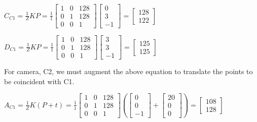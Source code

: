 \documentclass[12pt, letterpaper]{article}
\begin{document}
\vspace{0.4cm}
\indent $ C_{C1} = \frac{1}{Z}KP = \frac{1}{1}\begin{bmatrix}  1&0&128 \\ 0&1&128 \\ 0&0&1  \end{bmatrix} \begin{bmatrix} 0\\3\\-1 \end{bmatrix} = \begin{bmatrix} 128\\122 \end{bmatrix} $

\vspace{0.4cm}
\indent $ D_{C1} = \frac{1}{Z}KP = \frac{1}{1}\begin{bmatrix}  1&0&128 \\ 0&1&128 \\ 0&0&1  \end{bmatrix} \begin{bmatrix} 3\\3\\-1 \end{bmatrix} = \begin{bmatrix} 125\\125 \end{bmatrix} $

\vspace{0.6cm}

For camera, C2, we must augment the above equation to translate the points to be coincident with C1. 

\indent $ A_{C1} = \frac{1}{Z}K(P+t) = \frac{1}{1}\begin{bmatrix}  1&0&128 \\ 0&1&128 \\ 0&0&1  \end{bmatrix} ( \begin{bmatrix} 0\\0\\-1 \end{bmatrix}+\begin{bmatrix} 20\\0\\0 \end{bmatrix}
) = \begin{bmatrix} 108\\128 \end{bmatrix} $
\end{document}
